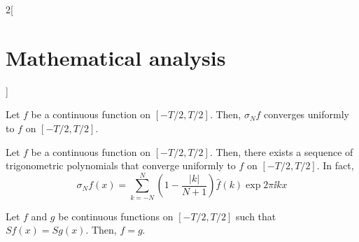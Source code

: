 \documentclass[../../../main.tex]{subfiles}
\begin{document}
\begin{multicols}{2}[\section{Mathematical analysis}]
\begin{theorem}
  \end{theorem}
  \begin{theorem}
    Let $f$ be a continuous function on $[-T/2,T/2]$. Then, $\sigma_Nf$ converges uniformly to $f$ on $[-T/2,T/2]$.
  \end{theorem}
  \begin{corollary}
    Let $f$ be a continuous function on $[-T/2,T/2]$. Then, there exists a sequence of trigonometric polynomials that converge uniformly to $f$ on $[-T/2,T/2]$. In fact, $$\sigma_Nf(x)=\sum_{k=-N}^N\left(1-\frac{|k|}{N+1}\right)\widehat{f}(k)\exp{2\pi\ii kx}$$
  \end{corollary}
  \begin{corollary}
    Let $f$ and $g$ be continuous functions on $[-T/2,T/2]$ such that $Sf(x)=Sg(x)$. Then, $f=g$.
  \end{corollary}

\end{multicols}
\end{document}
